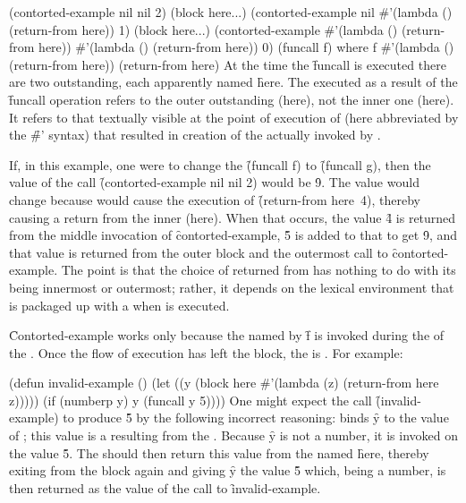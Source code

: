 \code
 (contorted-example nil nil 2)
   (block here\ssso ...)
     (contorted-example nil #'(lambda () (return-from here)) 1)
       (block here\ssst ...)
         (contorted-example #'(lambda () (return-from here))
                            #'(lambda () (return-from here))
                            0)
             (funcall f)
                    where f \EV #'(lambda () (return-from here))
                 (return-from here)
\endcode
At the time the \f{funcall} is executed
there are two   outstanding, each apparently
named \f{here}.
The   executed as a result of the \f{funcall}
operation
refers to the outer outstanding 
(here\ssso), not the
inner one (here\ssst).
It
refers to that  textually visible at the point of
execution of 
(here abbreviated by the \f{\#'} syntax) that resulted
in creation of the   actually invoked by 
.                       

If, in this example, one were to change the \f{(funcall f)} to
\f{(funcall g)}, then the value of the call \f{(contorted-example nil nil 2)}
would be \f{9}.  The value would change because 
 would cause the
execution of \f{(return-from here\ssst\ 4)}, thereby causing
a return from the inner  (here\ssst).
When that occurs, the value \f{4} is returned from the
middle invocation of \f{contorted-example}, \f{5} is added to that
to get \f{9}, and that value is returned from the outer block
and the outermost call to \f{contorted-example}.  The point
is that the choice of 
returned from has nothing to do with its
being innermost or outermost; rather,
it depends on the lexical environment
that is packaged up with a  when
 is executed.
                                  
\endSubsection%

\f{Contorted-example} works only because the
 named by \f{f} is invoked during the  of the 
.
Once the flow of execution has left the block,
the  is .  For example:

\code
 (defun invalid-example ()
   (let ((y (block here #'(lambda (z) (return-from here z)))))
     (if (numberp y) y (funcall y 5))))
\endcode
One might expect the call \f{(invalid-example)} to produce \f{5}
by the following incorrect reasoning:
 binds \f{y} to the
value of ; this value is a  resulting
from the .  Because \f{y} is not a number, it is
invoked on the value \f{5}.  The  should then
return this value from the                      
 named \f{here}, thereby
exiting from the block again and giving \f{y} the value \f{5}
which, being a number, is then returned as the value of the call
to \f{invalid-example}.

